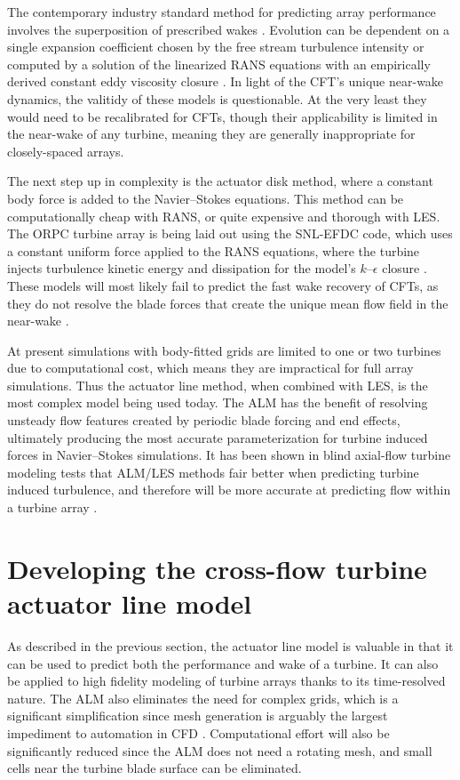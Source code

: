 The contemporary industry standard method for predicting array performance
involves the superposition of prescribed wakes \cite{Stevens2014b}. Evolution
can be dependent on a single expansion coefficient chosen by the free stream
turbulence intensity \cite{Jensen1983, Choi2013} or computed by a solution of
the linearized RANS equations with an empirically derived constant eddy
viscosity closure \cite{Ainslie1988}. In light of the CFT's unique near-wake
dynamics, the valitidy of these models is questionable. At the very least they
would need to be recalibrated for CFTs, though their applicability is limited in
the near-wake of any turbine, meaning they are generally inappropriate for
closely-spaced arrays.
	
The next step up in complexity is the actuator disk method, where a constant
body force is added to the Navier--Stokes equations. This method can be
computationally cheap with RANS, or quite expensive and thorough with LES. The
ORPC turbine array is being laid out using the SNL-EFDC code, which uses a
constant uniform force applied to the RANS equations, where the turbine injects
turbulence kinetic energy and dissipation for the model's $k$--$\epsilon$
closure \cite{Nelson2013}. These models will most likely fail to predict the
fast wake recovery of CFTs, as they do not resolve the blade forces that create
the unique mean flow field in the near-wake \cite{Bachant2015-JoT}.
	
At present simulations with body-fitted grids are limited to one or two turbines
due to computational cost, which means they are impractical for full array
simulations. Thus the actuator line method, when combined with LES, is the most
complex model being used today. The ALM has the benefit of resolving unsteady
flow features created by periodic blade forcing and end effects, ultimately
producing the most accurate parameterization for turbine induced forces in
Navier--Stokes simulations. It has been shown in blind axial-flow turbine
modeling tests that ALM/LES methods fair better when predicting turbine induced
turbulence, and therefore will be more accurate at predicting flow within a
turbine array \cite{Krogstad2013}.




\section{Developing the cross-flow turbine actuator line model}

As described in the previous section, the actuator line model is valuable in
that it can be used to predict both the performance and wake of a turbine. It
can also be applied to high fidelity modeling of turbine arrays thanks to its
time-resolved nature. The ALM also eliminates the need for complex grids, which
is a significant simplification since mesh generation is arguably the largest
impediment to automation in CFD \cite{Slotnick2014}. Computational effort will
also be significantly reduced since the ALM does not need a rotating mesh, and
small cells near the turbine blade surface can be eliminated.

